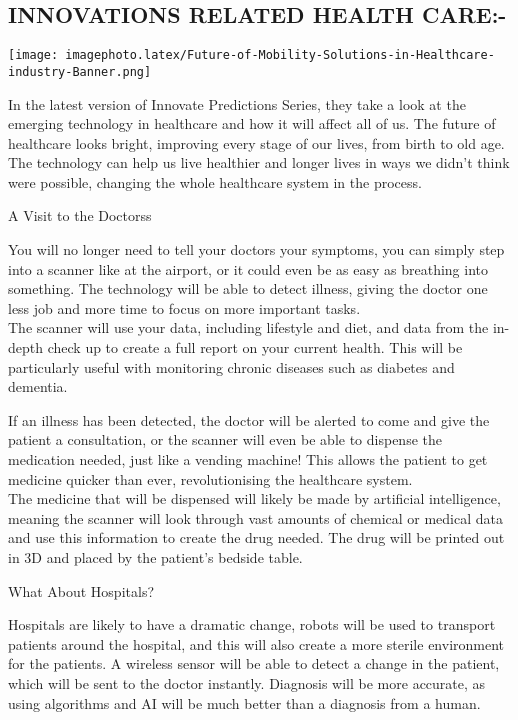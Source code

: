 \documentclass[12pt]{article}
\begin{document}
\begin{flushleft}

\section{INNOVATIONS RELATED HEALTH CARE:-}
\texttt{[image: imagephoto.latex/Future-of-Mobility-Solutions-in-Healthcare-industry-Banner.png]}


In the latest version of Innovate  Predictions Series, they take a look at the emerging technology in healthcare and how it will affect all of us. The future of healthcare looks bright, improving every stage of our lives, from birth to old age. The technology can help us live healthier and longer lives in ways we didn’t think were possible, changing the whole healthcare system in the process.


 





\textsf{\large A Visit to the Doctorss} 

You will no longer need to tell your doctors your symptoms, you can simply step into a scanner like at the airport, or it could even be as easy as breathing into something. The technology will be able to detect illness, giving the doctor one less job and more time to focus on more important tasks.\\
The scanner will use your data, including lifestyle and diet, and data from the in-depth check up to create a full report on your current health. This will be particularly useful with monitoring chronic diseases such as diabetes and dementia.


If an illness has been detected, the doctor will be alerted to come and give the patient a consultation, or the scanner will even be able to dispense the medication needed, just like a vending machine! This allows the patient to get medicine quicker than ever, revolutionising the healthcare system.\\

The medicine that will be dispensed will likely be made by artificial intelligence, meaning the scanner will look through vast amounts of chemical or medical data and use this information to create the drug needed. The drug will be printed out in 3D and placed by the patient’s bedside table.

\textsf{\large What About Hospitals?    }    

Hospitals are likely to have a dramatic change, robots will be used to transport patients around the hospital, and this will also create a more sterile environment for the patients. A wireless sensor will be able to detect a change in the patient, which will be sent to the doctor instantly. Diagnosis will be more accurate, as using algorithms and AI will be much better than a diagnosis from a human.\\
[1.25cm]






\end{flushleft}
\end{document}
